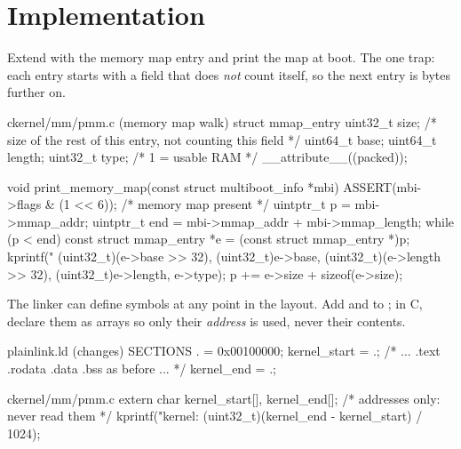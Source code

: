 \documentclass[11pt,a4paper]{article}
\begin{document}
\section{Implementation}

Extend  with the memory map entry and print the map at boot. The one trap: each entry starts with a
 field that does \emph{not} count itself, so the next entry is  bytes further on.

\begin{lst}{c}{kernel/mm/pmm.c (memory map walk)}
struct mmap_entry {
    uint32_t size;          /* size of the rest of this entry, not counting this field */
    uint64_t base;
    uint64_t length;
    uint32_t type;          /* 1 = usable RAM */
} __attribute__((packed));

void print_memory_map(const struct multiboot_info *mbi)
{
    ASSERT(mbi->flags & (1 << 6));                  /* memory map present */
    uintptr_t p   = mbi->mmap_addr;
    uintptr_t end = mbi->mmap_addr + mbi->mmap_length;
    while (p < end) {
        const struct mmap_entry *e = (const struct mmap_entry *)p;
        kprintf("  %
                (uint32_t)(e->base >> 32), (uint32_t)e->base,
                (uint32_t)(e->length >> 32), (uint32_t)e->length, e->type);
        p += e->size + sizeof(e->size);
    }
}
\end{lst}

The linker can define symbols at any point in the layout. Add  and  to
; in C, declare them as arrays so only their \emph{address} is used, never their contents.

\begin{lst}{plain}{link.ld (changes)}
SECTIONS
{
    . = 0x00100000;
    kernel_start = .;
    /* ... .text .rodata .data .bss as before ... */
    kernel_end = .;
}
\end{lst}

\begin{lst}{c}{kernel/mm/pmm.c}
extern char kernel_start[], kernel_end[];     /* addresses only: never read them */
kprintf("kernel: %
        (uint32_t)(kernel_end - kernel_start) / 1024);
\end{lst}
\end{document}
